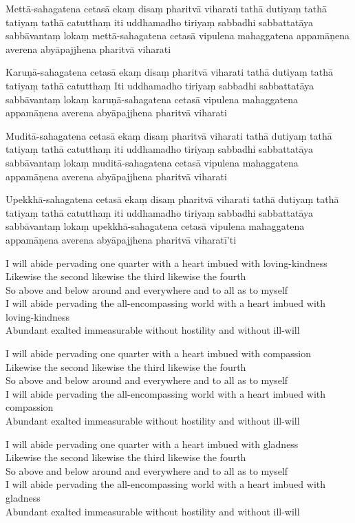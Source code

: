 Mettā-sahagatena cetasā ekaṃ disaṃ pharitvā viharati tathā dutiyaṃ tathā tatiyaṃ tathā catutthaṃ iti uddhamadho tiriyaṃ sabbadhi sabbattatāya sabbāvantaṃ lokaṃ mettā-sahagatena cetasā vipulena mahaggatena appamāṇena averena abyāpajjhena pharitvā viharati

Karuṇā-sahagatena cetasā ekaṃ disaṃ pharitvā viharati tathā dutiyaṃ tathā tatiyaṃ tathā catutthaṃ
Iti uddhamadho tiriyaṃ sabbadhi sabbattatāya sabbāvantaṃ lokaṃ karuṇā-sahagatena cetasā vipulena mahaggatena appamāṇena averena abyāpajjhena pharitvā viharati

Muditā-sahagatena cetasā ekaṃ disaṃ pharitvā viharati tathā dutiyaṃ tathā tatiyaṃ tathā catutthaṃ iti uddhamadho tiriyaṃ sabbadhi sabbattatāya sabbāvantaṃ lokaṃ muditā-sahagatena cetasā vipulena mahaggatena appamāṇena averena abyāpajjhena pharitvā viharati

Upekkhā-sahagatena cetasā ekaṃ disaṃ pharitvā viharati tathā dutiyaṃ tathā tatiyaṃ tathā catutthaṃ iti uddhamadho tiriyaṃ sabbadhi sabbattatāya sabbāvantaṃ lokaṃ upekkhā-sahagatena cetasā vipulena mahaggatena appamāṇena averena abyāpajjhena pharitvā viharatī'ti

\begin{leader}
\end{leader}

I will abide pervading one quarter with a heart imbued with loving-kindness\\
Likewise the second likewise the third likewise the fourth\\
So above and below around and everywhere and to all as to myself\\
I will abide pervading the all-encompassing world with a heart imbued with loving-kindness\\
Abundant exalted immeasurable without hostility and without ill-will

I will abide pervading one quarter with a heart imbued with compassion\\
Likewise the second likewise the third likewise the fourth\\
So above and below around and everywhere and to all as to myself\\
I will abide pervading the all-encompassing world with a heart imbued with compassion\\
Abundant exalted immeasurable without hostility and without ill-will

I will abide pervading one quarter with a heart imbued with gladness\\
Likewise the second likewise the third likewise the fourth\\
So above and below around and everywhere and to all as to myself\\
I will abide pervading the all-encompassing world with a heart imbued with gladness\\
Abundant exalted immeasurable without hostility and without ill-will

